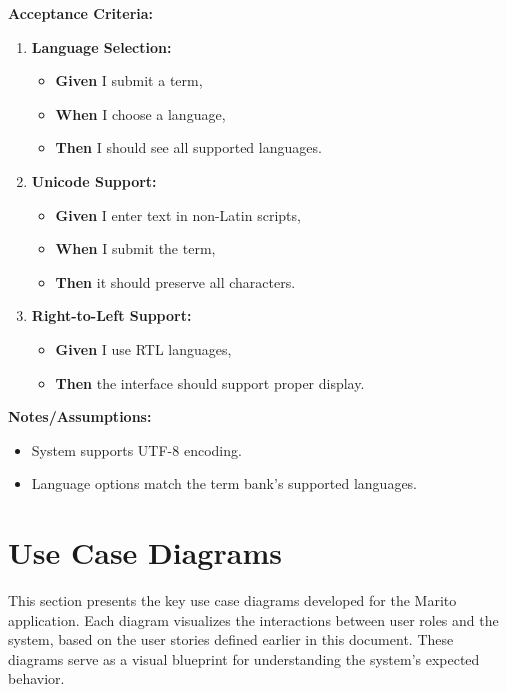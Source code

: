 \documentclass[12pt]{article}
\begin{document}
\vspace{1em}
\textbf{Acceptance Criteria:}
\begin{enumerate}
\item \textbf{Language Selection:}
\begin{itemize}
\item \textbf{Given} I submit a term,
\item \textbf{When} I choose a language,
\item \textbf{Then} I should see all supported languages.
\end{itemize}

\item \textbf{Unicode Support:}
\begin{itemize}
    \item \textbf{Given} I enter text in non-Latin scripts,
    \item \textbf{When} I submit the term,
    \item \textbf{Then} it should preserve all characters.
\end{itemize}

\item \textbf{Right-to-Left Support:}
\begin{itemize}
    \item \textbf{Given} I use RTL languages,
    \item \textbf{Then} the interface should support proper display.
\end{itemize}
\end{enumerate}

\vspace{1em}
\textbf{Notes/Assumptions:}
\begin{itemize}
\item System supports UTF-8 encoding.
\item Language options match the term bank's supported languages.
\end{itemize}

\section{Use Case Diagrams}

This section presents the key use case diagrams developed for the Marito application. Each diagram visualizes the interactions between user roles and the system, based on the user stories defined earlier in this document. These diagrams serve as a visual blueprint for understanding the system's expected behavior.
\end{document}

